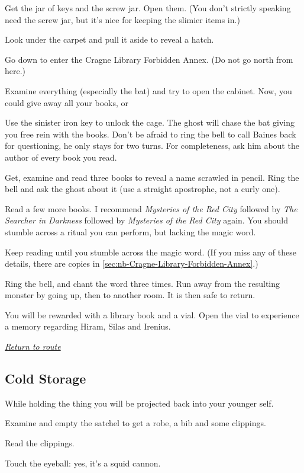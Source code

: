 \documentclass[a5paper]{extarticle}
\begin{document}
Get the jar of keys and the screw jar. Open them.
(You don't strictly speaking need the screw jar,
but it's nice for keeping the slimier items in.)

Look under the carpet and pull it aside to reveal a hatch.

Go down to enter the Cragne Library Forbidden Annex.
(Do not go north from here.)

Examine everything (especially the bat) and try to open the cabinet.
Now, you could give away all your books, or\xelip

Use the sinister iron key to unlock the cage.
The ghost will chase the bat giving you free rein with the books.
Don't be afraid to ring the bell to call Baines back for questioning,
he only stays for two turns.
For completeness, ask him about the author of every book you read.

Get, examine and read three books to reveal a name scrawled in pencil.
Ring the bell and ask the ghost about it (use a straight apostrophe, not a curly one).

Read a few more books.
I recommend \emph{Mysteries of the Red City} followed by \emph{The Searcher in Darkness}
followed by \emph{Mysteries of the Red City} again.
You should stumble across a ritual you can perform, but lacking the magic word.

Keep reading until you stumble across the magic word. (If you miss any of these
details, there are copies in \cref{sec:nb-Cragne-Library-Forbidden-Annex}.)

Ring the bell, and chant the word three times.
Run away from the resulting monster by going up, then to another room.
It is then safe to return.

You will be rewarded with a library book and a vial.
Open the vial to experience a memory regarding Hiram, Silas and Irenius.

\hyperref[sec:route-8]{\emph{Return to route}}

\newpage
\subsection{Cold Storage}\label{sec:sol-Cold-Storage}

While holding the thing you will be projected back into your younger self.

Examine and empty the satchel to get a robe, a bib and some clippings.

Read the clippings.

Touch the eyeball: yes, it's a squid cannon.
\end{document}
